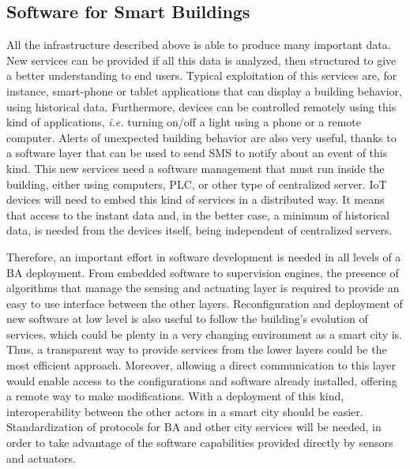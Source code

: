 \subsection{Software for Smart Buildings}
All the infrastructure described above is able to produce many important data.
New services can be provided if all this data is analyzed, then structured to give a better understanding to end users.
Typical exploitation of this services are, for instance, smart-phone or tablet applications that can display a building behavior, using historical data.
Furthermore, devices can be controlled remotely using this kind of applications, \textit{i.e.} turning on/off a light using a phone or a remote computer.
Alerts of unexpected building behavior are also very useful, thanks to a software layer that can be used to send SMS to notify about an event of this kind.
This new services need a software management that must run inside the building, either using computers, PLC, or other type of centralized server.
IoT devices will need to embed this kind of services in a distributed way.
It means that access to the instant data and, in the better case, a minimum of historical data, is needed from the devices itself, being independent of centralized servers.

Therefore, an important effort in software development is needed in all levels of a BA deployment.
From embedded software to supervision engines, the presence of algorithms that manage the sensing and actuating layer is required to provide an easy to use interface between the other layers.
Reconfiguration and deployment of new software at low level is also useful to follow the building's evolution of services, which could be plenty in a very changing environment as a smart city is.
Thus, a transparent way to provide services from the lower layers could be the most efficient approach.
Moreover, allowing a direct communication to this layer would enable access to the configurations and software already installed, offering a remote way to make modifications.
With a deployment of this kind, interoperability between the other actors in a smart city should be easier.
Standardization of protocols for BA and other city services will be needed, in order to take advantage of the software capabilities provided directly by sensors and actuators.


